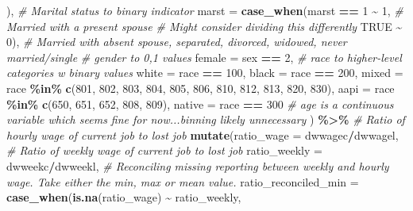 \documentclass[
]{article}
\newenvironment{Shaded}{\begin{snugshade}}{\end{snugshade}}
\newcommand{\AttributeTok}[1]{\textcolor[rgb]{0.13,0.29,0.53}{#1}}
\newcommand{\CommentTok}[1]{\textcolor[rgb]{0.56,0.35,0.01}{\textit{#1}}}
\newcommand{\ConstantTok}[1]{\textcolor[rgb]{0.56,0.35,0.01}{#1}}
\newcommand{\DecValTok}[1]{\textcolor[rgb]{0.00,0.00,0.81}{#1}}
\newcommand{\FunctionTok}[1]{\textcolor[rgb]{0.13,0.29,0.53}{\textbf{#1}}}
\newcommand{\NormalTok}[1]{#1}
\newcommand{\SpecialCharTok}[1]{\textcolor[rgb]{0.81,0.36,0.00}{\textbf{#1}}}
\begin{document}
\begin{Shaded}
\begin{Highlighting}[]
\NormalTok{                              ),}
         \CommentTok{\# Marital status to binary indicator}
         \AttributeTok{marst =} \FunctionTok{case\_when}\NormalTok{(marst }\SpecialCharTok{==} \DecValTok{1} \SpecialCharTok{\textasciitilde{}} \DecValTok{1}\NormalTok{, }\CommentTok{\# Married with a present spouse}
                           \CommentTok{\# Might consider dividing this differently}
                           \ConstantTok{TRUE} \SpecialCharTok{\textasciitilde{}} \DecValTok{0}\NormalTok{), }\CommentTok{\# Married with absent spouse, separated, divorced, widowed, never married/single}
         \CommentTok{\# gender to 0,1 values}
         \AttributeTok{female =}\NormalTok{ sex }\SpecialCharTok{==} \DecValTok{2}\NormalTok{,}
         \CommentTok{\# race to higher{-}level categories w binary values}
         \AttributeTok{white =}\NormalTok{ race }\SpecialCharTok{==} \DecValTok{100}\NormalTok{,}
         \AttributeTok{black =}\NormalTok{ race }\SpecialCharTok{==} \DecValTok{200}\NormalTok{,}
         \AttributeTok{mixed =}\NormalTok{ race }\SpecialCharTok{\%in\%} \FunctionTok{c}\NormalTok{(}\DecValTok{801}\NormalTok{, }\DecValTok{802}\NormalTok{, }\DecValTok{803}\NormalTok{, }\DecValTok{804}\NormalTok{, }\DecValTok{805}\NormalTok{, }\DecValTok{806}\NormalTok{, }\DecValTok{810}\NormalTok{, }\DecValTok{812}\NormalTok{, }\DecValTok{813}\NormalTok{, }\DecValTok{820}\NormalTok{, }\DecValTok{830}\NormalTok{),}
         \AttributeTok{aapi =}\NormalTok{ race }\SpecialCharTok{\%in\%} \FunctionTok{c}\NormalTok{(}\DecValTok{650}\NormalTok{, }\DecValTok{651}\NormalTok{, }\DecValTok{652}\NormalTok{, }\DecValTok{808}\NormalTok{, }\DecValTok{809}\NormalTok{),}
         \AttributeTok{native =}\NormalTok{ race }\SpecialCharTok{==} \DecValTok{300}
         \CommentTok{\# age is a continuous variable which seems fine for now...binning likely unnecessary}
\NormalTok{         ) }\SpecialCharTok{\%\textgreater{}\%} 
        \CommentTok{\# Ratio of hourly wage of current job to lost job}
  \FunctionTok{mutate}\NormalTok{(}\AttributeTok{ratio\_wage =}\NormalTok{ dwwagec}\SpecialCharTok{/}\NormalTok{dwwagel,}
         \CommentTok{\# Ratio of weekly wage of current job to lost job}
         \AttributeTok{ratio\_weekly =}\NormalTok{ dwweekc}\SpecialCharTok{/}\NormalTok{dwweekl,}
         \CommentTok{\# Reconciling missing reporting between weekly and hourly wage. Take either the min, max or mean value. }
         \AttributeTok{ratio\_reconciled\_min =} \FunctionTok{case\_when}\NormalTok{(}\FunctionTok{is.na}\NormalTok{(ratio\_wage) }\SpecialCharTok{\textasciitilde{}}\NormalTok{ ratio\_weekly, }

\end{Highlighting}
\end{Shaded}
\end{document}

